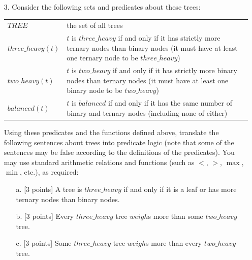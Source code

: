 \documentclass[12pt,fleqn]{article}
\begin{document}
\begin{enumerate}
\item[3.] Consider the following sets and predicates about these trees:

\begin{center}
\begin{tabular}{lp{4in}}
$TREE$ & the set of all trees\\
$three\_heavy(t)$ & $t$ is $three\_heavy$ if and only if it has strictly more ternary nodes than binary nodes (it must have at least one ternary node to be $three\_heavy$)\\
$two\_heavy(t)$ & $t$ is $two\_heavy$ if and only if it has strictly more binary nodes than ternary nodes (it must have at least one binary node to be $two\_heavy$)\\
$balanced(t)$ & $t$ is $balanced$ if and only if it has the same number of binary and ternary nodes (including none of either)
\end{tabular}
\end{center}

Using these predicates and the functions defined above, translate the following sentences about trees into predicate logic (note that some of the sentences may be false according to the definitions of the predicates). You may use standard arithmetic relations and functions (such as $<$, $>$, $\max$, $\min$, etc.), as required:

\begin{enumerate}
\item[a.] [3 points] A tree is $three\_heavy$ if and only if it is a leaf or has more ternary nodes than binary nodes. 

\vspace{1in} %

\item[b.] [3 points] Every $three\_heavy$ tree $weigh$s more than some $two\_heavy$ tree. 

\vspace{1in} %

\item[c.] [3 points] Some $three\_heavy$ tree $weigh$s more than every $two\_heavy$ tree. 


\end{enumerate}
\end{enumerate}
\end{document}

